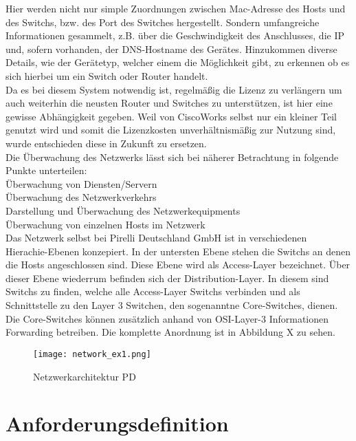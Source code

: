 Hier werden nicht nur simple Zuordnungen zwischen Mac-Adresse des Hosts und des Switchs, bzw. des Port des Switches hergestellt.
Sondern umfangreiche Informationen gesammelt, z.B. über die Geschwindigkeit des Anschlusses, die IP und, sofern vorhanden, der DNS-Hostname des Gerätes.
Hinzukommen diverse Details, wie der Gerätetyp, welcher einem die Möglichkeit gibt, zu erkennen ob es sich hierbei um ein Switch oder Router handelt.\\
Da es bei diesem System notwendig ist, regelmäßig die Lizenz zu verlängern um auch weiterhin die neusten Router und Switches zu unterstützen, ist hier eine gewisse Abhängigkeit gegeben.
Weil von CiscoWorks selbst nur ein kleiner Teil genutzt wird und somit die Lizenzkosten unverhältnismäßig zur Nutzung sind, wurde entschieden diese in Zukunft zu ersetzen.\\

Die Überwachung des Netzwerks lässt sich bei näherer Betrachtung in folgende Punkte unterteilen:\\
Überwachung von Diensten/Servern\\
Überwachung des Netzwerkverkehrs\\
Darstellung und Überwachung des Netzwerkequipments\\
Überwachung von einzelnen Hosts im Netzwerk\\

Das Netzwerk selbst bei Pirelli Deutschland GmbH ist in verschiedenen Hierachie-Ebenen konzepiert.
In der untersten Ebene stehen die Switchs an denen die Hosts angeschlossen sind. Diese Ebene wird als Access-Layer bezeichnet.
Über dieser Ebene wiederrum befinden sich der Distribution-Layer. In diesem sind Switchs zu finden, welche alle Access-Layer Switchs verbinden und als Schnittstelle zu den Layer 3 Switchen, den sogenanntne Core-Switches, dienen.
Die Core-Switches können zusätzlich anhand von OSI-Layer-3 Informationen Forwarding betreiben.
Die komplette Anordnung ist in Abbildung X zu sehen.


\begin{figure}[H]
\centering
\texttt{[image: network\_ex1.png]}
\caption{Netzwerkarchitektur PD}
\label{fig:show_s1_s2_p1_n1}
\end{figure}

\section{Anforderungsdefinition}
\label{sec:anfdef}

